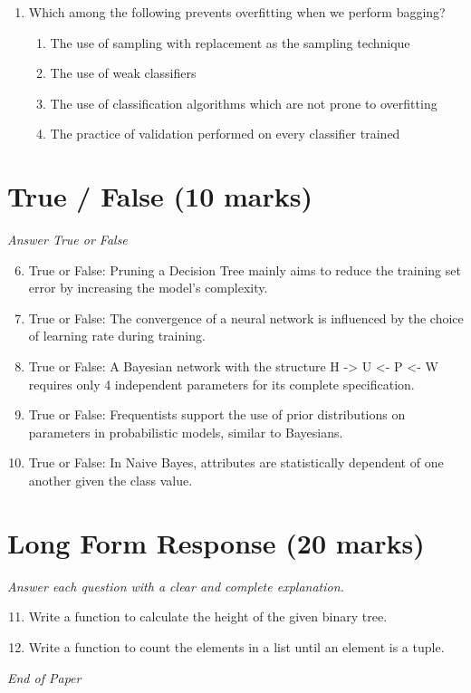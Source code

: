 \documentclass[12pt]{article}
\begin{document}
\begin{enumerate}[label=\arabic*.]
\begin{enumerate}[label=(\alph*)]
    \item True, True
    \item False, False
    \item True, False
    \item False, True
\end{enumerate}
\item Which among the following prevents overfitting when we perform bagging?
\begin{enumerate}[label=(\alph*)]
    \item The use of sampling with replacement as the sampling technique
    \item The use of weak classifiers
    \item The use of classification algorithms which are not prone to overfitting
    \item The practice of validation performed on every classifier trained
\end{enumerate}
\end{enumerate}

\section*{True / False (10 marks)}
\textit{Answer True or False}
\begin{enumerate}[label=\arabic*.]
\setcounter{enumi}{5}
\item True or False: Pruning a Decision Tree mainly aims to reduce the training set error by increasing the model's complexity.
\item True or False: The convergence of a neural network is influenced by the choice of learning rate during training.
\item True or False: A Bayesian network with the structure H -\textgreater{} U \textless{}- P \textless{}- W requires only 4 independent parameters for its complete specification.
\item True or False: Frequentists support the use of prior distributions on parameters in probabilistic models, similar to Bayesians.
\item True or False: In Naive Bayes, attributes are statistically dependent of one another given the class value.
\end{enumerate}

\section*{Long Form Response (20 marks)}
\textit{Answer each question with a clear and complete explanation.}
\begin{enumerate}[label=\arabic*.]
\setcounter{enumi}{10}
\item Write a function to calculate the height of the given binary tree.
\item Write a function to count the elements in a list until an element is a tuple.
\end{enumerate}

\vfill
\noindent\textit{End of Paper}
\end{document}
